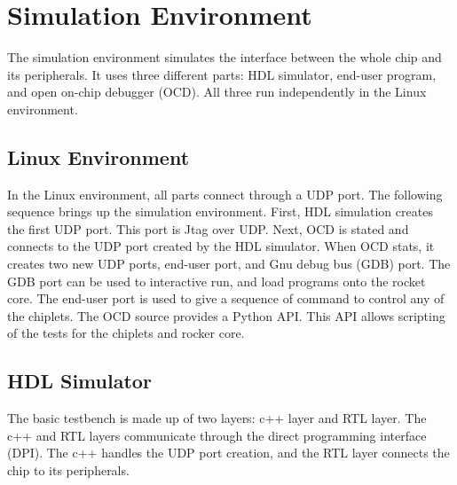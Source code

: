 \documentclass[../main.tex]{subfiles}
\begin{document}
\section{Simulation Environment}
The simulation environment simulates the interface between the whole chip and its peripherals. It uses three different parts: HDL simulator, end-user program, and open on-chip debugger (OCD).  All three run independently in the Linux environment.
\subsection{Linux Environment}
In the Linux environment, all parts connect through a UDP port. The following sequence brings up the simulation environment. First, HDL simulation creates the first UDP port. This port is Jtag over UDP. Next, OCD is stated and connects to the UDP port created by the HDL simulator. When OCD stats, it creates two new UDP ports, end-user port, and  Gnu debug bus (GDB) port. The GDB port can be used to interactive run, and load programs onto the rocket core. The end-user port is used to give a sequence of command to control any of the chiplets. The OCD source provides a Python API. This API allows scripting of the tests for the chiplets and rocker core.

\subsection{HDL Simulator}
The basic testbench is made up of two layers: c++ layer and RTL layer. The c++ and RTL layers communicate through the direct programming interface (DPI). The c++ handles the UDP port creation, and the RTL layer connects the chip to its peripherals.  
\end{document}
